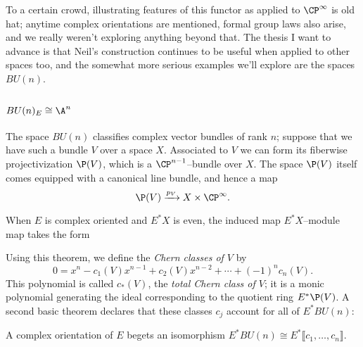 
To a certain crowd, illustrating features of this functor as applied to $\CP^\infty$ is old hat; anytime complex orientations are mentioned, formal group laws also arise, and we really weren't exploring anything beyond that.  The thesis I want to advance is that Neil's construction continues to be useful when applied to other spaces too, and the somewhat more serious examples we'll explore are the spaces $BU(n)$.

\subsection*{$BU(n)_E \cong \A^n$}

The space $BU(n)$ classifies complex vector bundles of rank $n$; suppose that we have such a bundle $V$ over a space $X$.  Associated to $V$ we can form its fiberwise projectivization $\P(V)$, which is a $\CP^{n-1}$--bundle over $X$.  The space $\P(V)$ itself comes equipped with a canonical line bundle, and hence a map \[\P(V) \xrightarrow{p_V} X \times \CP^\infty.\]

\begin{theorem}
When $E$ is complex oriented and $E^* X$ is even, the induced map $E^* X$--module map takes the form
\begin{center}
\end{center}
\end{theorem}

\noindent Using this theorem, we define the \emph{Chern classes of $V$} by \[0 = x^n - c_1(V) x^{n-1} + c_2(V) x^{n-2} + \cdots + (-1)^n c_n(V).\]  This polynomial is called $c_*(V)$, the \emph{total Chern class of $V$}; it is a monic polynomial generating the ideal corresponding to the quotient ring $E^* \P(V)$.  A second basic theorem declares that these classes $c_j$ account for all of $E^* BU(n)$:

\begin{theorem}
A complex orientation of $E$ begets an isomorphism $E^* BU(n) \cong E^*\llbracket c_1, \ldots, c_n \rrbracket$.
\end{theorem}

